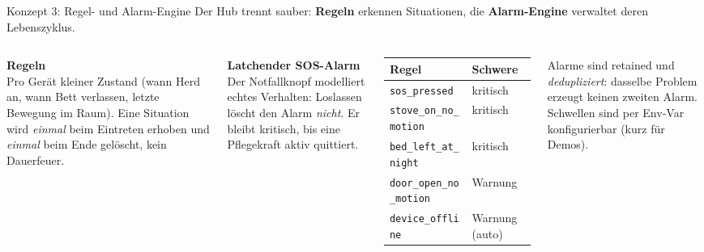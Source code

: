 \documentclass[aspectratio=169,11pt]{beamer}
\begin{document}
\begin{frame}{Konzept 3: Regel- und Alarm-Engine}
  Der Hub trennt sauber: \textbf{Regeln} erkennen Situationen, die \textbf{Alarm-Engine}
  verwaltet deren Lebenszyklus.

  \vspace{0.6em}
  \begin{columns}[T]
      \textbf{Regeln}\\
      Pro Ger\"at kleiner Zustand (wann Herd an, wann Bett verlassen, letzte Bewegung im Raum).
      Eine Situation wird \emph{einmal} beim Eintreten erhoben und \emph{einmal} beim Ende
      gel\"oscht, kein Dauerfeuer.

      \vspace{0.6em}
      \textbf{Latchender SOS-Alarm}\\
      Der Notfallknopf modelliert echtes Verhalten: Loslassen l\"oscht den Alarm \emph{nicht}.
      Er bleibt kritisch, bis eine Pflegekraft aktiv quittiert.

      \footnotesize
      \begin{tabular}{@{}l l@{}}
        \toprule
        \textbf{Regel} & \textbf{Schwere} \\
        \midrule
        \texttt{sos\_pressed} & \textcolor{accentRed}{kritisch} \\
        \texttt{stove\_on\_no\_motion} & \textcolor{accentRed}{kritisch} \\
        \texttt{bed\_left\_at\_night} & \textcolor{accentRed}{kritisch} \\
        \texttt{door\_open\_no\_motion} & \textcolor{mLightBrown}{Warnung} \\
        \texttt{device\_offline} & \textcolor{mLightBrown}{Warnung (auto)} \\
        \bottomrule
      \end{tabular}
      \vspace{0.6em}

      {\scriptsize Alarme sind retained und \emph{dedupliziert}: dasselbe Problem erzeugt
      keinen zweiten Alarm. Schwellen sind per Env-Var konfigurierbar (kurz f\"ur Demos).}
  \end{columns}
\end{frame}
\end{document}
